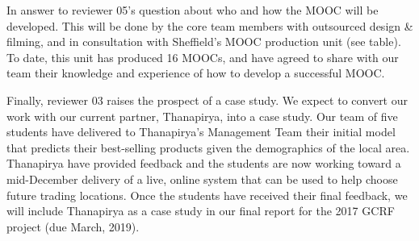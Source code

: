 \documentclass[11pt]{article}
\begin{document}
\vspace{2mm}
\noindent
In answer to reviewer 05's question about who and how the MOOC will be developed. This will be done by the core team members with outsourced design \& filming, and in consultation with Sheffield's MOOC production unit (see table). To date, this unit has produced 16 MOOCs, and have agreed to share with our team their knowledge and experience of how to develop a successful MOOC.  

\vspace{2mm}
\noindent
Finally, reviewer 03 raises the prospect of a case study. We expect to convert our work with our current partner, Thanapirya, into a case study. Our team of five students have delivered to Thanapirya's Management Team their initial model that predicts their best-selling products given the demographics of the local area. Thanapirya have provided feedback and the students are now working toward a mid-December delivery of a live, online system that can be used to help choose future trading locations. Once the students have received their final feedback, we will include Thanapirya as a case study in our final report for the 2017 GCRF project (due March, 2019). 
\end{document}
